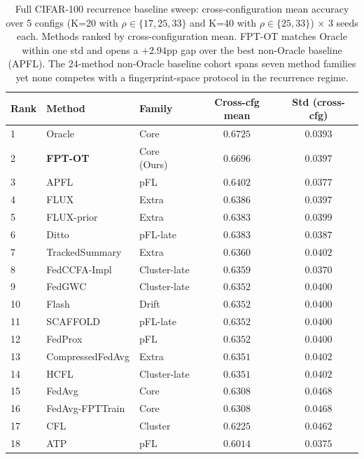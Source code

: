 \begin{table}[h]
\centering
\caption{Full CIFAR-100 recurrence baseline sweep: cross-configuration mean accuracy over 5 configs (K=20 with $\rho \in \{17,25,33\}$ and K=40 with $\rho \in \{25,33\}$) $\times$ 3 seeds each. Methods ranked by cross-configuration mean. FPT-OT matches Oracle within one std and opens a $+2.94$pp gap over the best non-Oracle baseline (APFL). The 24-method non-Oracle baseline cohort spans seven method families yet none competes with a fingerprint-space protocol in the recurrence regime.}
\label{tab:cifar_full_sweep}
\small
\setlength{\tabcolsep}{4pt}
\begin{tabular}{lllcc}
\toprule
Rank & Method & Family & Cross-cfg mean & Std (cross-cfg) \\
\midrule
1  & Oracle            & Core          & $0.6725$  & $0.0393$ \\
2  & \textbf{FPT-OT}   & Core (Ours)   & $\mathbf{0.6696}$  & $0.0397$ \\
3  & APFL              & pFL           & $0.6402$  & $0.0377$ \\
4  & FLUX              & Extra         & $0.6386$  & $0.0397$ \\
5  & FLUX-prior        & Extra         & $0.6383$  & $0.0399$ \\
6  & Ditto             & pFL-late      & $0.6383$  & $0.0387$ \\
7  & TrackedSummary    & Extra         & $0.6360$  & $0.0402$ \\
8  & FedCCFA-Impl      & Cluster-late  & $0.6359$  & $0.0370$ \\
9  & FedGWC            & Cluster-late  & $0.6352$  & $0.0400$ \\
10 & Flash             & Drift         & $0.6352$  & $0.0400$ \\
11 & SCAFFOLD          & pFL-late      & $0.6352$  & $0.0400$ \\
12 & FedProx           & pFL           & $0.6352$  & $0.0400$ \\
13 & CompressedFedAvg  & Extra         & $0.6351$  & $0.0402$ \\
14 & HCFL              & Cluster-late  & $0.6351$  & $0.0402$ \\
15 & FedAvg            & Core          & $0.6308$  & $0.0468$ \\
16 & FedAvg-FPTTrain   & Core          & $0.6308$  & $0.0468$ \\
17 & CFL               & Cluster       & $0.6225$  & $0.0462$ \\
18 & ATP               & pFL           & $0.6014$  & $0.0375$ \\

\end{tabular}
\end{table}
